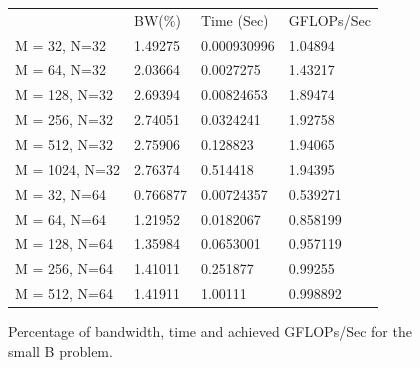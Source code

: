 \documentclass[12pt] {article}
\begin{document}
\begin{figure}[tbh]
 \centering    
\begin{tabular}{ |p{4cm}|| p{2cm}|p{2cm}|p{3cm}|}
 \hline
 & BW($\%$) &  Time (Sec)  & GFLOPs/Sec\\ 
 \hhline{|=||=|=|=|}
 \hline
 M = 32, N=32   & 1.49275  & 0.000930996 &  1.04894 \\
 M = 64, N=32   & 2.03664 & 0.0027275  & 1.43217 \\
 M = 128, N=32  & 2.69394 &0.00824653 & 1.89474 \\
 M = 256, N=32  & 2.74051  &0.0324241  &1.92758 \\
 M = 512, N=32  & 2.75906  &0.128823  &1.94065 \\
 M = 1024, N=32 & 2.76374  &0.514418  &1.94395 \\
 \hhline{|=||=|=|=|}
 M = 32,  N=64  & 0.766877& 0.00724357 & 0.539271 \\
 M = 64,  N=64  & 1.21952 & 0.0182067  & 0.858199 \\
 M = 128, N=64 & 1.35984 & 0.0653001  & 0.957119 \\
 M = 256, N=64 & 1.41011 & 0.251877   & 0.99255  \\
 M = 512, N=64 & 1.41911 & 1.00111    & 0.998892 \\
 
 \hline
\end{tabular} 
\caption{Percentage of bandwidth, time and achieved GFLOPs/Sec for the small B problem.}
   \label{tab:stat}
\end{figure} 
\end{document}
